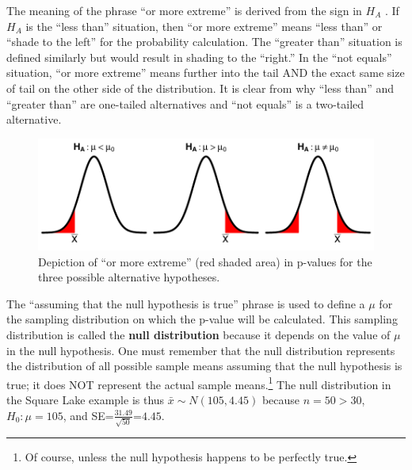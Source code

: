 \documentclass[10pt,openany]{book}\usepackage[]{graphicx}\usepackage[]{color}
\newenvironment{knitrout}{}{} %
\begin{document}

The meaning of the phrase ``or more extreme'' is derived from the sign in $H_{A}$ .  If $H_{A}$ is the ``less than'' situation, then ``or more extreme'' means ``less than'' or ``shade to the left'' for the probability calculation.  The ``greater than'' situation is defined similarly but would result in shading to the ``right.''  In the ``not equals'' situation, ``or more extreme'' means further into the tail AND the exact same size of tail on the other side of the distribution.  It is clear from  why ``less than'' and ``greater than'' are one-tailed alternatives and ``not equals'' is a two-tailed alternative.

\begin{knitrout}
\color{fgcolor}\begin{figure}[hbtp]

{\centering \includegraphics[width=.8\linewidth]{Figs/HOtails-1} 

}

\caption[Depiction of ``or more extreme'' (red shaded area) in p-values for the three possible alternative hypotheses]{Depiction of ``or more extreme'' (red shaded area) in p-values for the three possible alternative hypotheses.}\label{fig:HOtails}
\end{figure}


\end{knitrout}

The ``assuming that the null hypothesis is true'' phrase is used to define a $\mu$ for the sampling distribution on which the p-value will be calculated.  This sampling distribution is called the \textbf{null distribution} because it depends on the value of $\mu$ in the null hypothesis.  One must remember that the null distribution represents the distribution of all possible sample means assuming that the null hypothesis is true; it does NOT represent the actual sample means.\footnote{Of course, unless the null hypothesis happens to be perfectly true.}  The null distribution in the Square Lake example is thus $\bar{x}\sim N(105,4.45)$ because $n=50>30$, $H_{0}:\mu=105$, and SE=$\frac{31.49}{\sqrt{50}}$=$4.45$.
\end{document}
